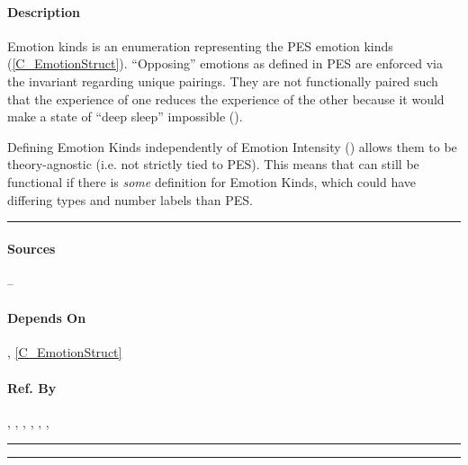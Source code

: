 \paragraph{Description} Emotion kinds is an enumeration representing the PES
emotion kinds (\cref{C_EmotionStruct}). ``Opposing'' emotions as defined in PES
are enforced via the invariant regarding unique pairings. They are not
functionally paired such that the experience of one reduces the experience of
the other because it would make a state of ``deep sleep'' impossible
().

Defining Emotion Kinds independently of Emotion Intensity
() allows them to be theory-agnostic (i.e. not
strictly tied to PES). This means that \progname{} can still be functional if
there is \textit{some} definition for Emotion Kinds, which could have differing
types and number labels than PES. \\\hrule

\paragraph{Sources} --

\paragraph{Depends On} , \cref{C_EmotionStruct}

\paragraph{Ref. By} , ,
, ,
, ,
 \\\hrule\vspace{0.5mm}\hrule

~\newline

